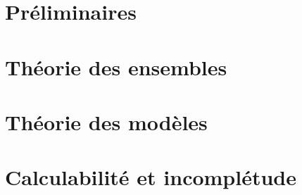 \documentclass[11pt, a4paper, french]{book}
\begin{document}
	
	
	
	
	
	
	
	\mainmatter
	
	
	
	\part{Préliminaires}\label{part.preli}
	
	

	

        

        

        


        \part{Théorie des ensembles}\label{part.tde}

        

        

        

        

        
	
	
	\part{Théorie des modèles}\label{part.tdm}
	
	

        
        \part{Calculabilité et incomplétude}\label{part.calc}

        

        
\end{document}
